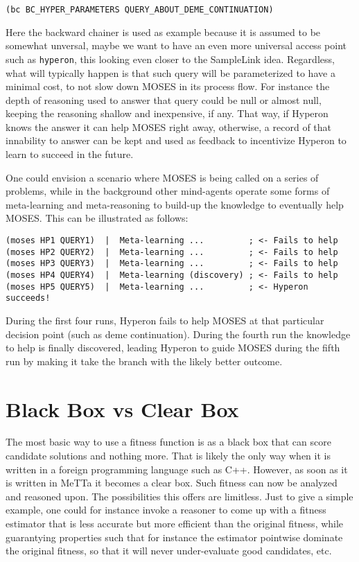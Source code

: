 \documentclass[]{report}
\begin{document}
\begin{verbatim}
(bc BC_HYPER_PARAMETERS QUERY_ABOUT_DEME_CONTINUATION)
\end{verbatim}
Here the backward chainer is used as example because it is assumed to
be somewhat unversal, maybe we want to have an even more universal
access point such as \texttt{hyperon}, this looking even closer to the
SampleLink idea.  Regardless, what will typically happen is that
such query will be parameterized to have a minimal cost, to not slow
down MOSES in its process flow.  For instance the depth of reasoning
used to answer that query could be null or almost null, keeping the
reasoning shallow and inexpensive, if any.  That way, if Hyperon knows
the answer it can help MOSES right away, otherwise, a record of that
innability to answer can be kept and used as feedback to incentivize
Hyperon to learn to succeed in the future.

One could envision a scenario where MOSES is being called on a series
of problems, while in the background other mind-agents operate some
forms of meta-learning and meta-reasoning to build-up the knowledge to
eventually help MOSES.  This can be illustrated as follows:

{\small
\begin{verbatim}
(moses HP1 QUERY1)  |  Meta-learning ...         ; <- Fails to help
(moses HP2 QUERY2)  |  Meta-learning ...         ; <- Fails to help
(moses HP3 QUERY3)  |  Meta-learning ...         ; <- Fails to help
(moses HP4 QUERY4)  |  Meta-learning (discovery) ; <- Fails to help
(moses HP5 QUERY5)  |  Meta-learning ...         ; <- Hyperon succeeds!
\end{verbatim}
} During the first four runs, Hyperon fails to help MOSES at that
particular decision point (such as deme continuation).  During the
fourth run the knowledge to help is finally discovered, leading
Hyperon to guide MOSES during the fifth run by making it take the
branch with the likely better outcome.

\section{Black Box vs Clear Box}
\label{sec:blackbox-clearbox}

The most basic way to use a fitness function is as a black box that
can score candidate solutions and nothing more.  That is likely the
only way when it is written in a foreign programming language such as
C++.  However, as soon as it is written in MeTTa it becomes a clear
box.  Such fitness can now be analyzed and reasoned upon.  The
possibilities this offers are limitless.  Just to give a simple
example, one could for instance invoke a reasoner to come up with a
fitness estimator that is less accurate but more efficient than the
original fitness, while guarantying properties such that for instance
the estimator pointwise dominate the original fitness, so that it will
never under-evaluate good candidates, etc.
\end{document}

